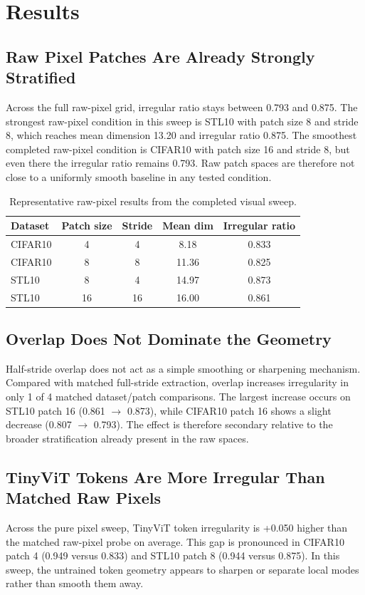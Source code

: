 \documentclass{article}
\newcommand{\dataset}[1]{\textsc{#1}}
\begin{document}
\section{Results}
\subsection{Raw Pixel Patches Are Already Strongly Stratified}
Across the full raw-pixel grid, irregular ratio stays between 0.793 and 0.875. The strongest raw-pixel condition in this sweep is \dataset{STL10} with patch size 8 and stride 8, which reaches mean dimension 13.20 and irregular ratio 0.875. The smoothest completed raw-pixel condition is \dataset{CIFAR10} with patch size 16 and stride 8, but even there the irregular ratio remains 0.793. Raw patch spaces are therefore not close to a uniformly smooth baseline in any tested condition.

\begin{table}[H]
\centering
\caption{Representative raw-pixel results from the completed visual sweep.}
\begin{tabular}{lcccc}
\toprule
Dataset & Patch size & Stride & Mean dim & Irregular ratio \\
\midrule
CIFAR10 & 4 & 4 & 8.18 & 0.833 \\
CIFAR10 & 8 & 8 & 11.36 & 0.825 \\
STL10 & 8 & 4 & 14.97 & 0.873 \\
STL10 & 16 & 16 & 16.00 & 0.861 \\
\bottomrule
\end{tabular}
\label{tab:raw}
\end{table}

\subsection{Overlap Does Not Dominate the Geometry}
Half-stride overlap does not act as a simple smoothing or sharpening mechanism. Compared with matched full-stride extraction, overlap increases irregularity in only 1 of 4 matched dataset/patch comparisons. The largest increase occurs on \dataset{STL10} patch 16 (0.861 $\rightarrow$ 0.873), while \dataset{CIFAR10} patch 16 shows a slight decrease (0.807 $\rightarrow$ 0.793). The effect is therefore secondary relative to the broader stratification already present in the raw spaces.

\subsection{TinyViT Tokens Are More Irregular Than Matched Raw Pixels}
Across the pure pixel sweep, TinyViT token irregularity is +0.050 higher than the matched raw-pixel probe on average. This gap is pronounced in \dataset{CIFAR10} patch 4 (0.949 versus 0.833) and \dataset{STL10} patch 8 (0.944 versus 0.875). In this sweep, the untrained token geometry appears to sharpen or separate local modes rather than smooth them away.
\end{document}
